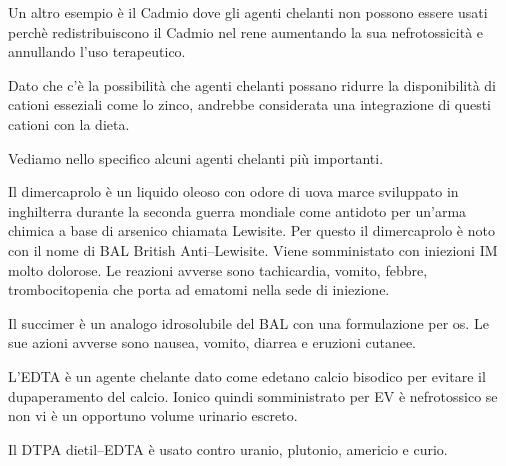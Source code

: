 Un altro esempio è il Cadmio dove gli agenti chelanti non possono essere usati perchè redistribuiscono il Cadmio nel rene aumentando la sua nefrotossicità e annullando l'uso terapeutico.

Dato che c'è la possibilità che agenti chelanti possano ridurre la disponibilità di cationi esseziali come lo zinco, andrebbe considerata una integrazione di questi cationi con la dieta.

Vediamo nello specifico alcuni agenti chelanti più importanti.

Il dimercaprolo è un liquido oleoso con odore di uova marce sviluppato in inghilterra durante la seconda guerra mondiale come antidoto per un'arma chimica a base di arsenico chiamata Lewisite. Per questo il dimercaprolo è noto con il nome di BAL British Anti--Lewisite. Viene somministato con iniezioni IM molto dolorose. Le reazioni avverse sono tachicardia, vomito, febbre, trombocitopenia che porta ad ematomi nella sede di iniezione.

Il succimer è un analogo idrosolubile del BAL con una formulazione per os. Le sue azioni avverse sono nausea, vomito, diarrea e eruzioni cutanee.

L'EDTA è un agente chelante dato come edetano calcio bisodico per evitare il dupaperamento del calcio. Ionico quindi somministrato per EV è nefrotossico se non vi è un opportuno volume urinario escreto.

Il DTPA dietil--EDTA è usato contro uranio, plutonio, americio e curio.


\newpage